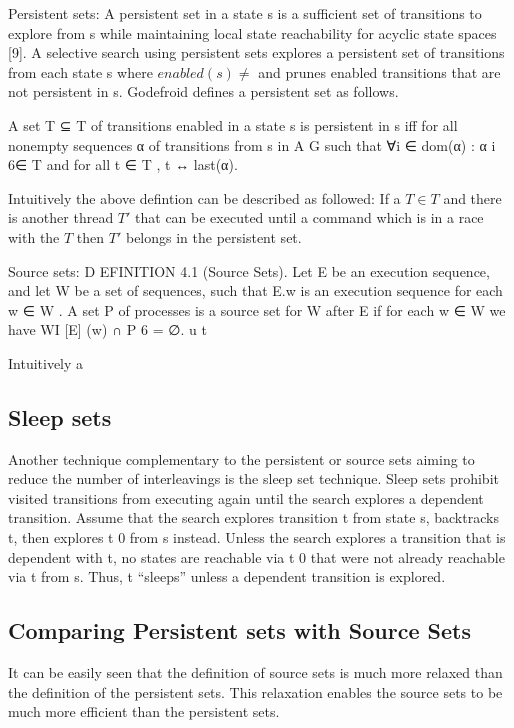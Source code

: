 \documentclass[a4paper,10pt]{article}
\begin{document}
Persistent sets: A persistent set in a state s is a sufficient set of transitions to
explore from s while maintaining local state reachability for acyclic state spaces [9]. A selective search using persistent
sets explores a persistent set of transitions from each state s where $enabled(s) \neq $ and prunes enabled transitions that
are not persistent in s. Godefroid defines a persistent set as follows.

A set T ⊆ T of transitions enabled in a state s is persistent in s iff for all nonempty sequences α of transitions from s
in A G such that ∀i ∈ dom(α) : α i 6∈ T and for all t ∈ T ,
t ↔ last(α).

Intuitively the above defintion can be described as followed: If a $T \in T$ and there is another thread $T'$ that can be executed until a command which
is in a race with the $T$ then $T'$ belongs in the persistent set.

Source sets: D EFINITION 4.1 (Source Sets). Let E be an execution sequence,
and let W be a set of sequences, such that E.w is an execution
sequence for each w ∈ W . A set P of processes is a source set for
W after E if for each w ∈ W we have WI [E] (w) ∩ P 6 = ∅.
u
t

Intuitively a 

\subsection{Sleep sets}
Another technique complementary to the persistent or source sets aiming to reduce the number of interleavings is the sleep set technique.
Sleep sets prohibit visited transitions from executing again
until the search explores a dependent transition. Assume that
the search explores transition t from state s, backtracks t,
then explores t 0 from s instead. Unless the search explores
a transition that is dependent with t, no states are reachable
via t 0 that were not already reachable via t from s. Thus, t
“sleeps” unless a dependent transition is explored.

\subsection{Comparing Persistent sets with Source Sets}

It can be easily seen that the definition of source sets is much more relaxed than the definition of the persistent sets. 
This relaxation enables the source sets to be much more efficient than the persistent sets.
\end{document}
